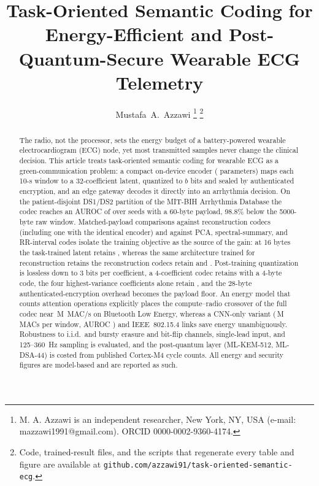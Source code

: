 \documentclass[journal]{IEEEtran}
\begin{document}
\title{Task-Oriented Semantic Coding for Energy-Efficient and Post-Quantum-Secure Wearable ECG Telemetry}
\author{Mustafa~A.~Azzawi%
\thanks{M. A. Azzawi is an independent researcher, New York, NY, USA (e-mail: mazzawi1991@gmail.com). ORCID 0000-0002-9360-4174.}%
\thanks{Code, trained-result files, and the scripts that regenerate every table and figure are available at \texttt{github.com/azzawi91/task-oriented-semantic-ecg}.}}
\maketitle

\begin{abstract}
The radio, not the processor, sets the energy budget of a battery-powered wearable electrocardiogram (ECG) node, yet most transmitted samples never change the clinical decision. This article treats task-oriented semantic coding for wearable ECG as a green-communication problem: a compact on-device encoder (\mainParams{} parameters) maps each 10-s window to a 32-coefficient latent, quantized to $b$ bits and sealed by authenticated encryption, and an edge gateway decodes it directly into an arrhythmia decision. On the patient-disjoint DS1/DS2 partition of the MIT-BIH Arrhythmia Database the codec reaches an AUROC of \mainAUROC{} over \nSeeds{} seeds with a 60-byte payload, 98.8\% below the 5000-byte raw window. Matched-payload comparisons against reconstruction codecs\ifhavepe{} (including one with the identical encoder)\fi{} and against PCA, spectral-summary, and RR-interval codes isolate the training objective as the source of the gain: at 16 bytes the task-trained latent retains \taskNativeSixteen{}, whereas \ifhavepe the same architecture trained for reconstruction retains \sameencSixteen{}\else the reconstruction codecs retain \convaeSixteen{} and \jsccSixteen{}\fi. Post-training quantization is lossless down to 3 bits per coefficient, \ifhavelat a 4-coefficient codec retains \latFourAUROC{} with a 4-byte code, \else the four highest-variance coefficients alone retain \subTopFour{}, \fi and the 28-byte authenticated-encryption overhead becomes the payload floor. An energy model that counts attention operations explicitly places the compute--radio crossover of the full codec near \crossMMAC{}\,M~MAC/s on Bluetooth Low Energy, whereas a CNN-only variant (\cnnMACs{}\,M MACs per window, AUROC \cnnAUROC{}) and IEEE~802.15.4 links save energy unambiguously. Robustness to i.i.d.\ and bursty erasure and bit-flip channels, single-lead input, and 125--360~Hz sampling is evaluated, and the post-quantum layer (ML-KEM-512, ML-DSA-44) is costed from published Cortex-M4 cycle counts. All energy and security figures are model-based and are reported as such.
\end{abstract}
\end{document}
